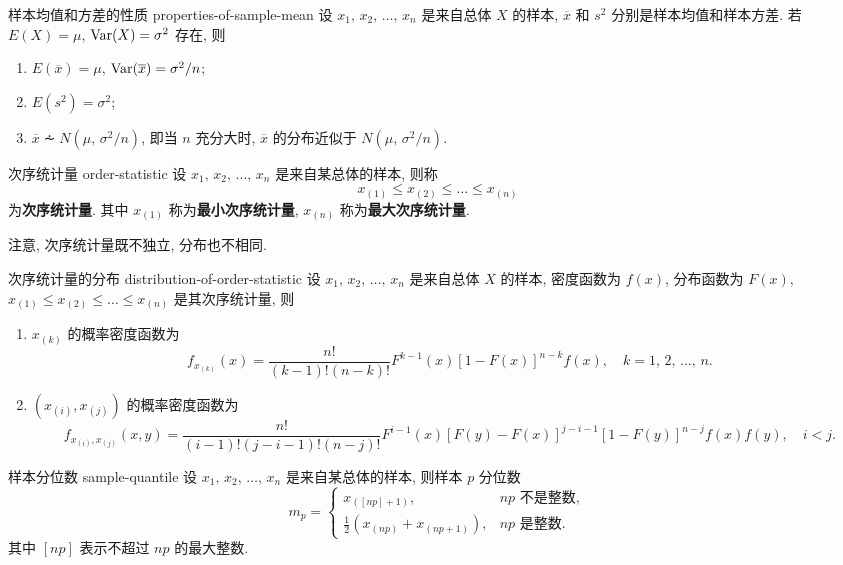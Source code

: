 \begin{newtheorembox}{样本均值和方差的性质 }{properties-of-sample-mean}
	设 $x_1,\,x_2,\,\dots,\,x_n$ 是来自总体 $X$ 的样本, $\overline{x}$ 和 $s^2$ 分别是样本均值和样本方差.  若 $E(X)=\mu$, $\mathop{\mathrm{Var}}\nolimits(X)=\sigma^2$ 存在, 则
	\begin{enumerate}
		\item $E(\overline{x})=\mu$, $\mathop{\mathrm{Var}}\nolimits(\overline{x})=\sigma^2/n$;
		\item $E(s^2)=\sigma^2$;
		\item $\overline{x}\dotsim N(\mu,\,\sigma^2/n)$, 即当 $n$ 充分大时, $\overline{x}$ 的分布近似于 $N(\mu,\,\sigma^2/n)$.
	\end{enumerate}
\end{newtheorembox}

\begin{newdefbox}{次序统计量 }{order-statistic}
	设 $x_1,\,x_2,\,\dots,\,x_n$ 是来自某总体的样本, 则称
	\[
		x_{(1)}\leqslant x_{(2)}\leqslant\dots\leqslant x_{(n)}
	\]
	为\textbf{次序统计量}.  其中 $x_{(1)}$ 称为\textbf{最小次序统计量}, $x_{(n)}$ 称为\textbf{最大次序统计量}.\par
	注意, 次序统计量既不独立, 分布也不相同.
\end{newdefbox}

\begin{newtheorembox}{次序统计量的分布 }{distribution-of-order-statistic}
	设 $x_1,\,x_2,\,\dots,\,x_n$ 是来自总体 $X$ 的样本, 密度函数为 $f(x)$, 分布函数为 $F(x)$, $x_{(1)}\leqslant x_{(2)}\leqslant\dots\leqslant x_{(n)}$ 是其次序统计量, 则
	\begin{enumerate}
		\item $x_{(k)}$ 的概率密度函数为
			\[
				f_{x_{(k)}}(x)=\frac{n!}{(k-1)!(n-k)!}F^{k-1}(x)[1-F(x)]^{n-k}f(x),\quad k=1,\,2,\,\dots,\,n.
			\]
		\item $(x_{(i)},x_{(j)})$ 的概率密度函数为
			\[
				f_{x_{(i)},x_{(j)}}(x,y)=\frac{n!}{(i-1)!(j-i-1)!(n-j)!}F^{i-1}(x)[F(y)-F(x)]^{j-i-1}[1-F(y)]^{n-j}f(x)f(y),\quad i<j.
			\]
	\end{enumerate}
\end{newtheorembox}

\begin{newdefbox}{样本分位数 }{sample-quantile}
	设 $x_1,\,x_2,\,\dots,\,x_n$ 是来自某总体的样本, 则样本 $p$ 分位数
	\[
		m_p=\begin{cases}
			x_{([np]+1)}, & np\text{ 不是整数},\\
			\frac{1}{2}(x_{(np)}+x_{(np+1)}), & np\text{ 是整数}.
		\end{cases}
	\]
	其中 $[np]$ 表示不超过 $np$ 的最大整数.
\end{newdefbox}

